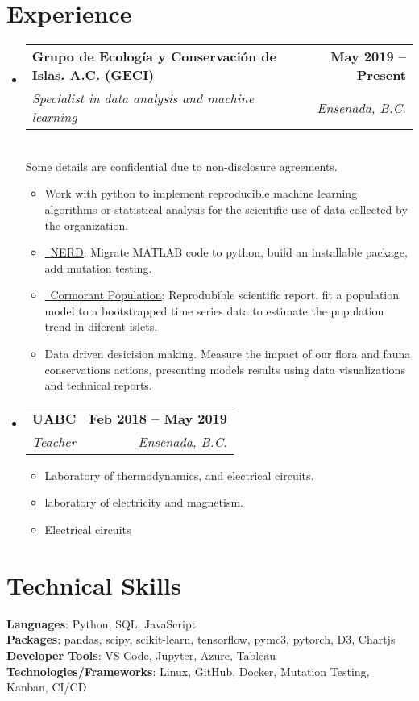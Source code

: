 \documentclass[letterpaper,11pt]{article}
\makeatletter
\newcommand{\resumeItem}[1]{
  \item\small{
    {#1 \vspace{-2pt}}
  }
}
\newcommand{\resumeSubheading}[4]{
  \vspace{-2pt}\item
    \begin{tabular*}{1.0\textwidth}[t]{l@{\extracolsep{\fill}}r}
      \textbf{#1} & \textbf{\small #2} \\
      \textit{\small#3} & \textit{\small #4} \\
    \end{tabular*}\vspace{-7pt}
}
\newcommand{\resumeSubHeadingListStart}{\begin{itemize}[leftmargin=0.0in, label={}]}
\newcommand{\resumeSubHeadingListEnd}{\end{itemize}}
\newcommand{\resumeItemListStart}{\begin{itemize}}
\newcommand{\resumeItemListEnd}{\end{itemize}\vspace{-5pt}}
\makeatother
\begin{document}
\section{Experience}
  \resumeSubHeadingListStart

    \resumeSubheading
      {Grupo de Ecología y Conservación de Islas. A.C. (GECI)}{May 2019 -- Present}
      {Specialist in data analysis and machine learning}{Ensenada, B.C.}\\ \vspace{7pt}
      \small Some details are confidential due to non-disclosure agreements.
      \resumeItemListStart
        \resumeItem{Work with python to implement reproducible machine learning algorithms or statistical analysis for the scientific use of data collected by the organization.}
        \resumeItem{\href{https://github.com/IslasGECI/nerd}{\raisebox{-0.2\height}\faGithub\ \underline{NERD}}: Migrate MATLAB code to python, build an installable package, add mutation testing.}
        \resumeItem{\href{https://github.com/IslasGECI/cormorant_population_growth}{\raisebox{-0.2\height}\faGithub\ \underline{Cormorant Population}}: Reprodubible scientific report, fit a population model to a bootstrapped time series data to estimate the population trend in diferent islets.}
        \resumeItem{Data driven desicision making. Measure the impact of our flora and fauna conservations actions, presenting models results using data visualizations and technical reports.}

      \resumeItemListEnd

    \resumeSubheading
      {UABC}{Feb 2018 -- May 2019}
      {Teacher}{Ensenada, B.C.} \vspace{3pt}
      \resumeItemListStart Courses:
        \resumeItem{Laboratory of thermodynamics,  and electrical circuits.}
        \resumeItem{laboratory of electricity and magnetism.}
        \resumeItem{Electrical circuits}
    \resumeItemListEnd
    
  \resumeSubHeadingListEnd
\vspace{-16pt}

\section{Technical Skills}
 \begin{itemize}[leftmargin=0.15in, label={}]
    \small{\item{
     \textbf{Languages}{: Python, SQL, JavaScript} \\
     \textbf{Packages}{: pandas, scipy, scikit-learn, tensorflow, pymc3, pytorch, D3, Chartjs} \\
     \textbf{Developer Tools}{: VS Code, Jupyter, Azure, Tableau} \\
     \textbf{Technologies/Frameworks}{: Linux, GitHub, Docker, Mutation Testing, Kanban, CI/CD} \\
    }}
 \end{itemize}
 \vspace{-16pt}
\end{document}
